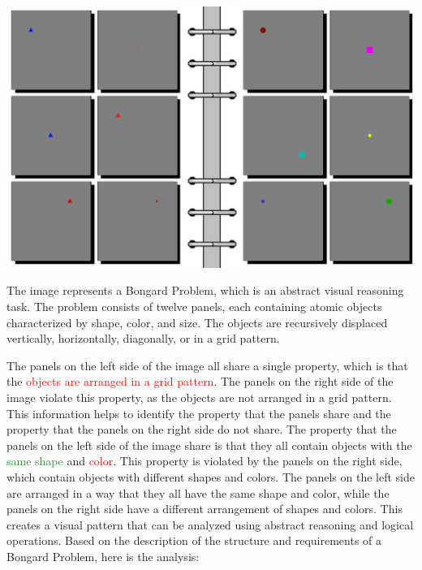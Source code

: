 \begin{tcolorbox}[breakable,enhanced jigsaw,opacityback=0,]
	\centering
	\includegraphics[width=.8\linewidth]{imgs/bongard/easy-0.png}\\
	\begin{dialogue}
		 The image represents a Bongard Problem, which is an abstract visual reasoning task. The problem consists of twelve panels, each containing atomic objects characterized by shape, color, and size. The objects are recursively displaced vertically, horizontally, diagonally, or in a grid pattern.
		
		The panels on the left side of the image all share a single property, which is that the \textcolor{red}{objects are arranged in a grid pattern}. The panels on the right side of the image violate this property, as the objects are not arranged in a grid pattern. This information helps to identify the property that the panels share and the property that the panels on the right side do not share.
		\vspace{1em}
		 The property that the panels on the left side of the image share is that they all contain objects with the \textcolor{ForestGreen}{same shape} and \textcolor{red}{color}. This property is violated by the panels on the right side, which contain objects with different shapes and colors. The panels on the left side are arranged in a way that they all have the same shape and color, while the panels on the right side have a different arrangement of shapes and colors. This creates a visual pattern that can be analyzed using abstract reasoning and logical operations.
		\vspace{1em}
		 Based on the description of the structure and requirements of a Bongard Problem, here is the analysis:
		

\end{dialogue}
\end{tcolorbox}

